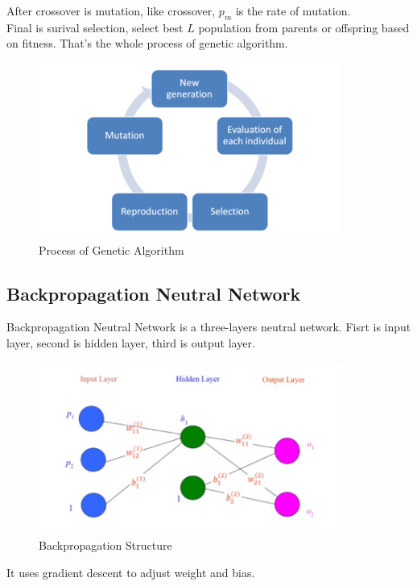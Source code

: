 \documentclass[conference]{IEEEtran}
\begin{document}
After crossover is mutation, like crossover, $p_m$ is the 
rate of mutation.\\

Final is surival selection, select best $L$ population from parents or offspring based on fitness. That's the whole process of genetic algorithm.\cite{b1}\\

\begin{figure}[htbp]
\centerline{\includegraphics{Genetic_algorithm.png}}
\caption{Process of Genetic Algorithm}
\label{fig}
\end{figure}

\subsection{Backpropagation Neutral Network}
Backpropagation Neutral Network is a three-layers neutral network. Fisrt is input layer, second is hidden layer, third is output layer.\cite{b2}\\

\begin{figure}[htbp]
\centerline{\includegraphics[width=10cm]{Backpropagation.png}}
\caption{Backpropagation Structure}
\label{fig}
\end{figure}

It uses gradient descent to adjust weight and bias.\\
\end{document}
